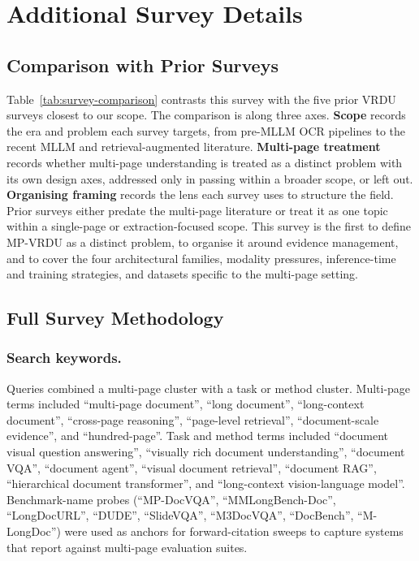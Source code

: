 \appendix


\chapter{Additional Survey Details}

\section{Comparison with Prior Surveys}
\label{app:survey-comparison}


Table~\ref{tab:survey-comparison} contrasts this survey with the five prior VRDU surveys closest to our scope. The comparison is along three axes. \textbf{Scope} records the era and problem each survey targets, from pre-MLLM OCR pipelines to the recent MLLM and retrieval-augmented literature. \textbf{Multi-page treatment} records whether multi-page understanding is treated as a distinct problem with its own design axes, addressed only in passing within a broader scope, or left out. \textbf{Organising framing} records the lens each survey uses to structure the field. Prior surveys either predate the multi-page literature or treat it as one topic within a single-page or extraction-focused scope. This survey is the first to define MP-VRDU as a distinct problem, to organise it around evidence management, and to cover the four architectural families, modality pressures, inference-time and training strategies, and datasets specific to the multi-page setting.

\section{Full Survey Methodology}
\label{app:sv_methodology}

\subsection{Search keywords.}
Queries combined a multi-page cluster with a task or method cluster. Multi-page terms included ``multi-page document'', ``long document'', ``long-context document'', ``cross-page reasoning'', ``page-level retrieval'', ``document-scale evidence'', and ``hundred-page''. Task and method terms included ``document visual question answering'', ``visually rich document understanding'', ``document VQA'', ``document agent'', ``visual document retrieval'', ``document RAG'', ``hierarchical document transformer'', and ``long-context vision-language model''. Benchmark-name probes (``MP-DocVQA'', ``MMLongBench-Doc'', ``LongDocURL'', ``DUDE'', ``SlideVQA'', ``M3DocVQA'', ``DocBench'', ``M-LongDoc'') were used as anchors for forward-citation sweeps to capture systems that report against multi-page evaluation suites.

